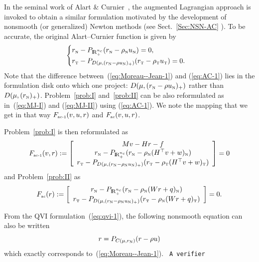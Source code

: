  In the seminal work of  Alart \& Curnier~\cite{Curnier.Alart88,Alart.Curnier1991}, the augmented Lagrangian approach is invoked to obtain a  similar formulation motivated by the development of nonsmooth (or generalized) Newton methods (see Sect.~\ref{Sec:NSN-AC} ). To be accurate, the original Alart--Curnier function is given by 
\begin{equation}
  \label{eq:AC-1}
  \begin{cases}
    r_\n - P_{\RR^{n_c}_+}(r_\n - \rho_\n  u_\n) = 0, \\
    r_\t - P_{D(\mu, (r_\n - \rho u_\n)_+)}(r_\t - \rho_\t u_\t   )=0.
  \end{cases}
\end{equation}
Note that the difference between~(\ref{eq:Moreau--Jean-1}) and (\ref{eq:AC-1}) lies in the formulation disk onto which one project: $D(\mu, (r_{\hbox{\tiny{N}}} - \rho u_{\hbox{\tiny{N}}})_+)$ rather than $D(\mu, (r_{{\hbox{\tiny{N}}}})_+)$. Problem~\ref{prob:I} and~\ref{prob:II} can be also reformulated as in~(\ref{eq:MJ-I}) and (\ref{eq:MJ-II}) using (\ref{eq:AC-1}). We note the mapping that we get in that way $F_{{\hbox{\tiny{ac-1}}}}(v,u,r)$ and  $F_{{\hbox{\tiny{ac}}}}(v,u,r)$.


Problem~\ref{prob:I} is then reformulated as
\begin{equation}
  \label{eq:AC-I}
  F_{\acone}(v,r) := \left[
    \begin{array}{c}
    Mv - Hr - f \\
    r_\n - P_{\RR^{n_c}_+}(r_\n - \rho_\n (H^\top v +w)_\n) \\
    r_\t - P_{D(\mu, (r_\n - \rho_\n u_\n)_+)}(r_\t - \rho_\t (H^\top v +w)_\t   )
  \end{array}\right] =0
\end{equation}
and  Problem~\ref{prob:II}  as
\begin{equation}
  \label{eq:AC-II}
    F_{\actwo}(r) := \left[ \begin{array}{c}
    r_\n - P_{\RR^{n_c}_+}(r_\n - \rho_\n (W r +  q)_\n) \\
    r_\t - P_{D(\mu, (r_\n - \rho_\n u_\n)_+)}(r_\t - \rho_\n (W r +  q)_\t   )
  \end{array}\right] =0.
\end{equation}

\begin{remark}
  From the QVI formulation~(\ref{eq:qvi-1}), the following nonsmooth
  equation can also be written
  \begin{equation}
    \label{eq:qvi-proj}
    r = P_{C(\mu,r_\n)}(r-\rho u)
  \end{equation}
  which exactly corresponds to~(\ref{eq:Moreau--Jean-1}). \texttt{ A verifier}
\end{remark}

